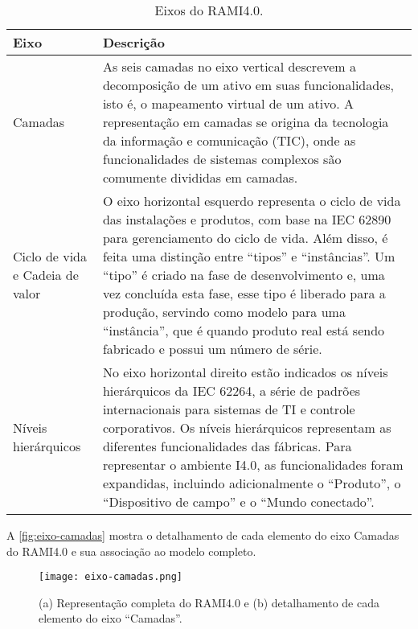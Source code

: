 	\begin{table}[htb]
		\centering
		\footnotesize
		\label{tab:rami-eixos}
		\begin{tabular}{p{3cm}p{12cm}}
			\hline
			\textbf{Eixo} &\textbf{Descrição} \\
			
			\hline
			Camadas
			& As seis camadas no eixo vertical descrevem a decomposição de um ativo em suas funcionalidades, isto é, o mapeamento virtual de um ativo. A representação em camadas se origina da tecnologia da informação e comunicação (TIC), onde as funcionalidades de sistemas complexos são comumente divididas em camadas. \\
			
			\hline
			Ciclo de vida e  Cadeia de valor
			& O eixo horizontal esquerdo representa o ciclo de vida das instalações e produtos, com base na IEC 62890 para gerenciamento do ciclo de vida. Além disso, é feita uma distinção entre ``tipos'' e ``instâncias''. Um ``tipo'' é criado na fase de desenvolvimento e, uma vez concluída esta fase, esse tipo é liberado para a produção, servindo como modelo para uma ``instância'', que é quando produto real está sendo fabricado e possui um número de série. \\
			
			\hline
			Níveis hierárquicos
			& No eixo horizontal direito estão indicados os níveis hierárquicos da IEC 62264, a série de padrões internacionais para sistemas de TI e controle corporativos. Os níveis hierárquicos representam as diferentes funcionalidades das fábricas. Para representar o ambiente I4.0, as funcionalidades foram expandidas, incluindo adicionalmente o ``Produto'', o ``Dispositivo de campo'' e o ``Mundo conectado''. \\
			\hline
			
		\end{tabular}
		\caption{Eixos do RAMI4.0.}
	\end{table}

	A \autoref{fig:eixo-camadas} mostra o detalhamento de cada elemento do eixo Camadas do RAMI4.0 e sua associação ao modelo completo.
	
	\begin{figure}[htb]
		\centering
		\label{fig:eixo-camadas}
		\texttt{[image: eixo-camadas.png]}
		\caption{(a) Representação completa do RAMI4.0 e (b) detalhamento de cada elemento do eixo ``Camadas''.}
	\end{figure}

